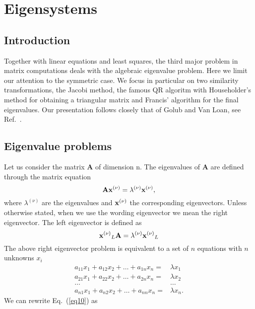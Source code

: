 

\chapter{Eigensystems}\label{chap:eigenvalue} 


\section{Introduction}
Together with linear equations and least squares, the third major problem in matrix computations
deals with the algebraic eigenvalue problem. Here we limit our attention
to the symmetric case. 
We focus in particular on two similarity transformations, the Jacobi method, 
the famous QR algoritm with Householder's method for obtaining a triangular matrix and 
Francis' algorithm for the final eigenvalues. Our presentation follows closely that of 
Golub and Van Loan, see Ref.~\cite{golub1996}.



\section{Eigenvalue problems}
%
Let us consider the matrix {\bf A} of dimension n. The eigenvalues of
{\bf A} are defined through the matrix equation 
%
\begin{equation}
\label{eq10}
   {\bf A}{\bf x^{(\nu)}} = \lambda^{(\nu)}{\bf x^{(\nu)}},
\end{equation}
%
where $\lambda^{(\nu)}$ are the eigenvalues and ${\bf x^{(\nu)}}$ the
corresponding eigenvectors.
Unless otherwise stated, when we use the wording eigenvector we mean the
right eigenvector. The left eigenvector is defined as 
\[
{\bf x^{(\nu)}}_L{\bf A} = \lambda^{(\nu)}{\bf x^{(\nu)}}_L
\]
The above right eigenvector problem is equivalent to a set of $n$ equations with $n$ unknowns
$x_i$
%
\begin{eqnarray} 
  a_{11}x_1 +a_{12}x_2 +\dots + a_{1n}x_n=&\lambda x_1 \nonumber\\
  a_{21}x_1 + a_{22}x_2 + \dots+ a_{2n}x_n=&\lambda x_2\nonumber \\
                                   \dots & \dots \nonumber \\  
  a_{n1}x_1 + a_{n2}x_2 + \dots + a_{nn}x_n=&\lambda x_n. \nonumber
\end{eqnarray}
%
We can rewrite Eq.~(\ref{eq10}) as

